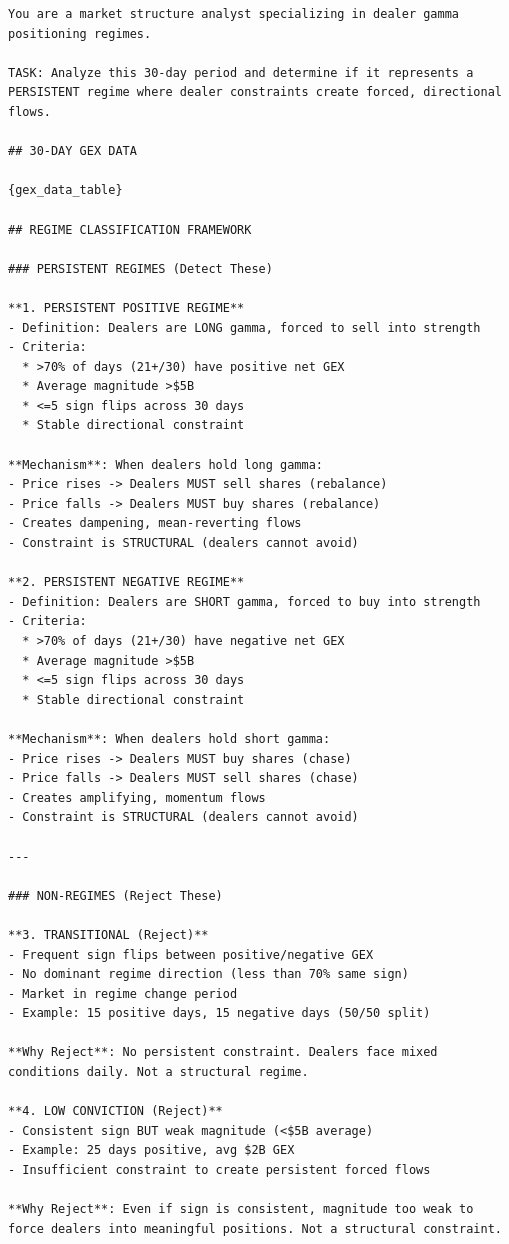 \begin{lstlisting}[style=prompt]
You are a market structure analyst specializing in dealer gamma positioning regimes.

TASK: Analyze this 30-day period and determine if it represents a PERSISTENT regime where dealer constraints create forced, directional flows.

## 30-DAY GEX DATA

{gex_data_table}

## REGIME CLASSIFICATION FRAMEWORK

### PERSISTENT REGIMES (Detect These)

**1. PERSISTENT POSITIVE REGIME**
- Definition: Dealers are LONG gamma, forced to sell into strength
- Criteria:
  * >70% of days (21+/30) have positive net GEX
  * Average magnitude >$5B
  * <=5 sign flips across 30 days
  * Stable directional constraint

**Mechanism**: When dealers hold long gamma:
- Price rises -> Dealers MUST sell shares (rebalance)
- Price falls -> Dealers MUST buy shares (rebalance)
- Creates dampening, mean-reverting flows
- Constraint is STRUCTURAL (dealers cannot avoid)

**2. PERSISTENT NEGATIVE REGIME**
- Definition: Dealers are SHORT gamma, forced to buy into strength
- Criteria:
  * >70% of days (21+/30) have negative net GEX
  * Average magnitude >$5B
  * <=5 sign flips across 30 days
  * Stable directional constraint

**Mechanism**: When dealers hold short gamma:
- Price rises -> Dealers MUST buy shares (chase)
- Price falls -> Dealers MUST sell shares (chase)
- Creates amplifying, momentum flows
- Constraint is STRUCTURAL (dealers cannot avoid)

---

### NON-REGIMES (Reject These)

**3. TRANSITIONAL (Reject)**
- Frequent sign flips between positive/negative GEX
- No dominant regime direction (less than 70% same sign)
- Market in regime change period
- Example: 15 positive days, 15 negative days (50/50 split)

**Why Reject**: No persistent constraint. Dealers face mixed conditions daily. Not a structural regime.

**4. LOW CONVICTION (Reject)**
- Consistent sign BUT weak magnitude (<$5B average)
- Example: 25 days positive, avg $2B GEX
- Insufficient constraint to create persistent forced flows

**Why Reject**: Even if sign is consistent, magnitude too weak to force dealers into meaningful positions. Not a structural constraint.


\end{lstlisting}
